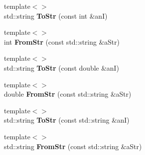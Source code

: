 \begin{DoxyCompactItemize}
\item 
{\footnotesize template$<$$>$ }\\std\+::string {\bfseries To\+Str} (const int \&anI)\hypertarget{classMMVII_1_1cStrIO_a86fe9b5f58d9e0873f94ac3559124a07}{}\label{classMMVII_1_1cStrIO_a86fe9b5f58d9e0873f94ac3559124a07}

\item 
{\footnotesize template$<$$>$ }\\int {\bfseries From\+Str} (const std\+::string \&a\+Str)\hypertarget{classMMVII_1_1cStrIO_ae077e90e3000402ae969972ad30c27a1}{}\label{classMMVII_1_1cStrIO_ae077e90e3000402ae969972ad30c27a1}

\item 
{\footnotesize template$<$$>$ }\\std\+::string {\bfseries To\+Str} (const double \&anI)\hypertarget{classMMVII_1_1cStrIO_a6c24ca7c57073fe580fb1dbae47f0264}{}\label{classMMVII_1_1cStrIO_a6c24ca7c57073fe580fb1dbae47f0264}

\item 
{\footnotesize template$<$$>$ }\\double {\bfseries From\+Str} (const std\+::string \&a\+Str)\hypertarget{classMMVII_1_1cStrIO_ab50d8235935550074326ad3599f132a2}{}\label{classMMVII_1_1cStrIO_ab50d8235935550074326ad3599f132a2}

\item 
{\footnotesize template$<$$>$ }\\std\+::string {\bfseries To\+Str} (const std\+::string \&anI)\hypertarget{classMMVII_1_1cStrIO_a5b59dc97c78ec436f27459d685914768}{}\label{classMMVII_1_1cStrIO_a5b59dc97c78ec436f27459d685914768}

\item 
{\footnotesize template$<$$>$ }\\std\+::string {\bfseries From\+Str} (const std\+::string \&a\+Str)\hypertarget{classMMVII_1_1cStrIO_a25dbf649bdc11b32cd71c9c4058f2209}{}\label{classMMVII_1_1cStrIO_a25dbf649bdc11b32cd71c9c4058f2209}

\end{DoxyCompactItemize}
